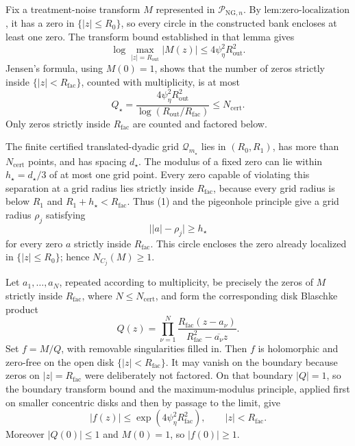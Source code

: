Fix a treatment-noise transform \(M\) represented in \(\mathcal P_{\mathrm{NG},n}\).  By \(\text{lem:zero-localization}\), it has a zero in \(\{|z|\le R_0\}\), so every circle in the constructed bank encloses at least one zero.  The transform bound established in that lemma gives
\[
 \log\max_{|z|=R_{\mathrm{out}}}|M(z)|
 \le4\psi_{\eta}^2R_{\mathrm{out}}^2.
\]
Jensen's formula, using \(M(0)=1\), shows that the number of zeros strictly inside \(\{|z|<R_{\mathrm{fac}}\}\), counted with multiplicity, is at most
\[
 Q_{\star}
 =\frac{4\psi_{\eta}^2R_{\mathrm{out}}^2}
        {\log(R_{\mathrm{out}}/R_{\mathrm{fac}})}
 \le N_{\mathrm{cert}}. \tag{1}
\]
Only zeros strictly inside \(R_{\mathrm{fac}}\) are counted and factored below.

The finite certified translated-dyadic grid \(\mathcal Q_{m_{\star}}\) lies in \((R_0,R_1)\), has more than \(N_{\mathrm{cert}}\) points, and has spacing \(d_{\star}\).  The modulus of a fixed zero can lie within \(h_{\star}=d_{\star}/3\) of at most one grid point.  Every zero capable of violating this separation at a grid radius lies strictly inside \(R_{\mathrm{fac}}\), because every grid radius is below \(R_1\) and \(R_1+h_{\star}<R_{\mathrm{fac}}\).  Thus (1) and the pigeonhole principle give a grid radius \(\rho_j\) satisfying
\[
 \bigl||a|-\rho_j\bigr|\ge h_{\star}
\]
for every zero \(a\) strictly inside \(R_{\mathrm{fac}}\).  This circle encloses the zero already localized in \(\{|z|\le R_0\}\); hence \(N_{C_j}(M)\ge1\).

Let \(a_1,\ldots,a_N\), repeated according to multiplicity, be precisely the zeros of \(M\) strictly inside \(R_{\mathrm{fac}}\), where \(N\le N_{\mathrm{cert}}\), and form the corresponding disk Blaschke product
\[
 Q(z)=\prod_{\nu=1}^N
 \frac{R_{\mathrm{fac}}(z-a_\nu)}
      {R_{\mathrm{fac}}^2-\overline{a_\nu}z}.
\]
Set \(f=M/Q\), with removable singularities filled in.  Then \(f\) is holomorphic and zero-free on the open disk \(\{|z|<R_{\mathrm{fac}}\}\).  It may vanish on the boundary because zeros on \(|z|=R_{\mathrm{fac}}\) were deliberately not factored.  On that boundary \(|Q|=1\), so the boundary transform bound and the maximum-modulus principle, applied first on smaller concentric disks and then by passage to the limit, give
\[
 |f(z)|\le \exp(4\psi_{\eta}^2R_{\mathrm{fac}}^2),
 \qquad |z|<R_{\mathrm{fac}}. \tag{2}
\]
Moreover \(|Q(0)|\le1\) and \(M(0)=1\), so \(|f(0)|\ge1\).

